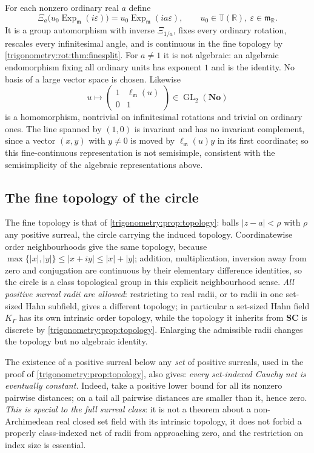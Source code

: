 \documentclass[11pt,letterpaper]{article}
\numberwithin{equation}{section}
\theoremstyle{definition}
\theoremstyle{remark}
\newcommand{\No}{\mathbf{No}}
\newcommand{\SC}{\mathbf{SC}}
\newcommand{\R}{\mathbb R}
\newcommand{\mm}{\mathfrak m}
\newcommand{\TT}{\mathbb T}
\newcommand{\eps}{\varepsilon}
\newcommand{\Ex}{\operatorname{Exp}_{\mm}}
\newcommand{\GL}{\operatorname{GL}}
\newcommand{\ellm}{\ell_{\mm}}
\begin{document}
For each nonzero ordinary real $a$ define
\begin{equation}\label{trigonometry:rot:eq:nonalgauto}
 \Xi_a\bigl(u_0\Ex(i\eps)\bigr)=u_0\Ex(ia\eps),\qquad u_0\in\TT(\R),\ \eps\in\mm_{\R}.
\end{equation}
It is a group automorphism with inverse $\Xi_{1/a}$, fixes every ordinary rotation, rescales every
infinitesimal angle, and is continuous in the fine topology by \cref{trigonometry:rot:thm:finesplit}.
For $a\ne1$ it is not algebraic: an algebraic endomorphism fixing all ordinary units has exponent $1$
and is the identity. No basis of a large vector space is chosen. Likewise
\begin{equation}\label{trigonometry:rot:eq:unipotent}
 u\longmapsto\begin{pmatrix}1&\ellm(u)\\0&1\end{pmatrix}\in\GL_2(\No)
\end{equation}
is a homomorphism, nontrivial on infinitesimal rotations and trivial on ordinary ones. The line
spanned by $(1,0)$ is invariant and has no invariant complement, since a vector $(x,y)$ with $y\ne0$
is moved by $\ellm(u)y$ in its first coordinate; so this fine-continuous representation is not
semisimple, consistent with the semisimplicity of the algebraic representations above.

\subsection{The fine topology of the circle}\label{trigonometry:rot:sec:topology}
The fine topology is that of \cref{trigonometry:prop:topology}: balls $|z-a|<\rho$ with $\rho$ any
positive surreal, the circle carrying the induced topology. Coordinatewise order neighbourhoods give
the same topology, because $\max\{|x|,|y|\}\le|x+iy|\le|x|+|y|$; addition, multiplication, inversion
away from zero and conjugation are continuous by their elementary difference identities, so the
circle is a class topological group in this explicit neighbourhood sense. \emph{All positive surreal
radii are allowed}: restricting to real radii, or to radii in one set-sized Hahn subfield, gives a
different topology; in particular a set-sized Hahn field $K_\Gamma$ has its own intrinsic order
topology, while the topology it inherits from $\SC$ is discrete by
\cref{trigonometry:prop:topology}. Enlarging the admissible radii changes the topology but no
algebraic identity.

The existence of a positive surreal below any \emph{set} of positive surreals, used in the proof of
\cref{trigonometry:prop:topology}, also gives: \emph{every set-indexed Cauchy net is eventually
constant.} Indeed, take a positive lower bound for all its nonzero pairwise distances; on a tail all
pairwise distances are smaller than it, hence zero. \emph{This is special to the full surreal class}:
it is not a theorem about a non-Archimedean real closed set field with its intrinsic topology, it does
not forbid a properly class-indexed net of radii from approaching zero, and the restriction on index
size is essential.
\end{document}
